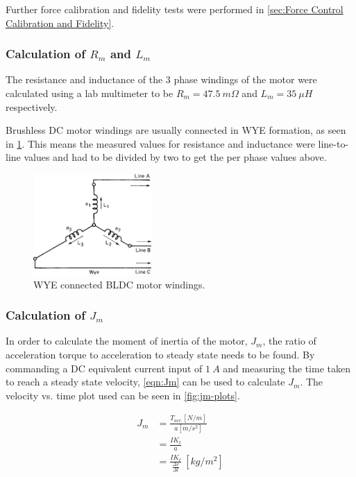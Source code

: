 Further force calibration and fidelity tests were performed in \cref{sec:Force Control Calibration and Fidelity}.

\subsubsection{Calculation of $R_m$ and $L_m$}
The resistance and inductance of the 3 phase windings of the motor were calculated using a lab multimeter to be $R_m = 47.5\ m\Omega$ and $L_m = 35\ \mu H$ respectively. 

Brushless DC motor windings are usually connected in WYE formation, as seen in \cref{fig:bldc-wye-connection}. This means the measured values for resistance and inductance were line-to-line values and had to be divided by two to get the per phase values above.

\begin{figure}
\centering
\includegraphics[width=0.4\textwidth]{images/motor/wye.jpg} 
\caption{WYE connected BLDC motor windings.}
\label{fig:bldc-wye-connection}
\end{figure}

\subsubsection{Calculation of $J_m$}
In order to calculate the moment of inertia of the motor, $J_m$, the ratio of acceleration torque to acceleration to steady state needs to be found. By commanding a DC equivalent current input of $1\ A$ and measuring the time taken to reach a steady state velocity, \cref{eqn:Jm} can be used to calculate $J_m$. The velocity vs. time plot used can be seen in \cref{fig:jm-plots}.

\begin{equation} \label{eqn:Jm}
\begin{aligned}
J_m &= \frac{T_{acc.}[N/m]}{a[m/s^2]} \\
&= \frac{IK_t}{a} \\
&= \frac{IK_t}{\frac{\Delta v}{\Delta t}}\ [kg/m^2]
\end{aligned}
\end{equation}

